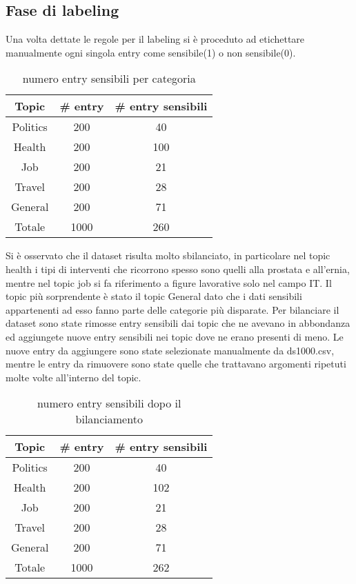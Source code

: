 \subsection{Fase di labeling}
Una volta dettate le regole per il labeling si è proceduto ad etichettare manualmente ogni singola entry come sensibile(1) o non sensibile(0).\newline
\begin{table}[t]
\centering
\begin{tabular}{|c|c|c|}
\hline
\textbf{Topic} & \textbf{\# entry} & \textbf{\# entry sensibili} \\ \hline
Politics & 200 & 40 \\ \hline
Health & 200 & 100 \\ \hline
Job & 200 & 21 \\ \hline
Travel & 200 & 28 \\ \hline
General & 200 & 71 \\ \hline
Totale & 1000 & 260 \\ \hline
\end{tabular}
\caption{numero entry sensibili per categoria}
\end{table}
\FloatBarrier
Si è osservato che il dataset risulta molto sbilanciato, in particolare nel topic health i tipi di interventi che ricorrono spesso sono quelli alla prostata e all'ernia, mentre nel topic job si fa riferimento a figure lavorative solo nel campo IT. Il topic più sorprendente è stato il topic General dato che i dati sensibili appartenenti ad esso fanno parte delle categorie più disparate.\newline
Per bilanciare il dataset sono state rimosse entry sensibili dai topic che ne avevano in abbondanza ed aggiungete nuove entry sensibili nei topic dove ne erano presenti di meno. Le nuove entry da aggiungere sono state selezionate manualmente da ds1000.csv, mentre le entry da rimuovere sono state quelle che trattavano argomenti ripetuti molte volte all'interno del topic.\newline
\begin{table}[h]
\centering
\begin{tabular}{|c|c|c|}
\hline
\textbf{Topic} & \textbf{\# entry} & \textbf{\# entry sensibili} \\ \hline
Politics & 200 & 40 \\ \hline
Health & 200 & 102 \\ \hline
Job & 200 & 21 \\ \hline
Travel & 200 & 28 \\ \hline
General & 200 & 71 \\ \hline
Totale & 1000 & 262 \\ \hline
\end{tabular}
\caption{numero entry sensibili dopo il bilanciamento}
\end{table}